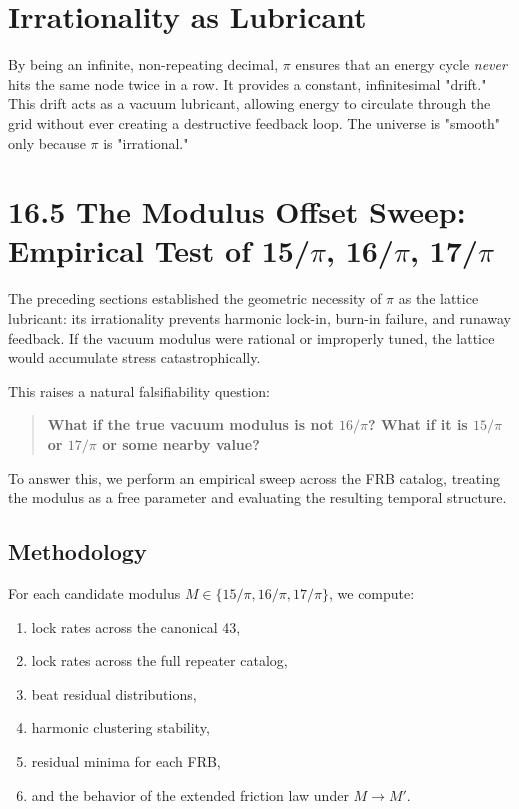 \documentclass[11pt, letterpaper, openany]{book}
\begin{document}
\section{Irrationality as Lubricant}
By being an infinite, non-repeating decimal, $\pi$ ensures that an energy cycle \textit{never} hits the same node twice in a row. It provides a constant, infinitesimal "drift." This drift acts as a vacuum lubricant, allowing energy to circulate through the grid without ever creating a destructive feedback loop. The universe is "smooth" only because $\pi$ is "irrational."

\section{16.5 The Modulus Offset Sweep: Empirical Test of 15/$\pi$, 16/$\pi$, 17/$\pi$}

The preceding sections established the geometric necessity of $\pi$ as the lattice lubricant:  
its irrationality prevents harmonic lock-in, burn-in failure, and runaway feedback.  
If the vacuum modulus were rational or improperly tuned, the lattice would accumulate stress 
catastrophically.

This raises a natural falsifiability question:

\begin{quote}
\textbf{What if the true vacuum modulus is not $16/\pi$?  
What if it is $15/\pi$ or $17/\pi$ or some nearby value?}
\end{quote}

To answer this, we perform an empirical sweep across the FRB catalog, treating the modulus as a 
free parameter and evaluating the resulting temporal structure.

\subsection*{Methodology}

For each candidate modulus $M \in \{15/\pi, 16/\pi, 17/\pi\}$, we compute:

\begin{enumerate}
    \item lock rates across the canonical 43,
    \item lock rates across the full repeater catalog,
    \item beat residual distributions,
    \item harmonic clustering stability,
    \item residual minima for each FRB,
    \item and the behavior of the extended friction law under $M \rightarrow M'$.
\end{enumerate}
\end{document}
